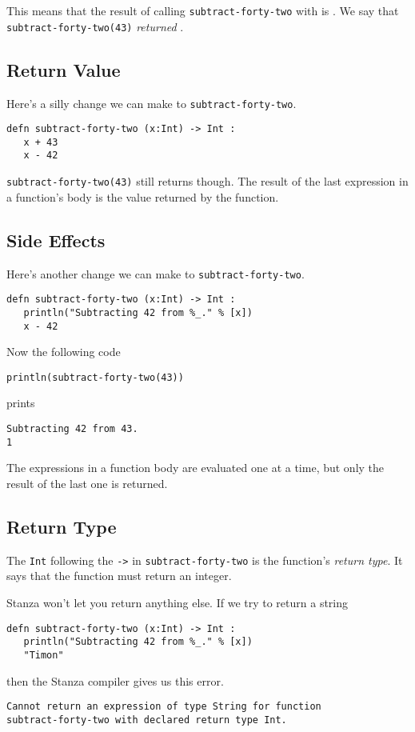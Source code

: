 \documentclass[10pt,oneside]{book}
\begin{document}
This means that the result of calling \texttt{\frenchspacing subtract-forty-two} with \texttt{} is \texttt{}. We say that \texttt{\frenchspacing subtract-forty-two(43)} {\em returned} \texttt{}. 

\subsection*{Return Value}
Here's a silly change we can make to \texttt{\frenchspacing subtract-forty-two}. 
\begin{lstlisting}
defn subtract-forty-two (x:Int) -> Int :
   x + 43
   x - 42   
\end{lstlisting}
\texttt{\frenchspacing subtract-forty-two(43)} still returns \texttt{} though. The result of the last expression in a function's body is the value returned by the function. 

\subsection*{Side Effects}
Here's another change we can make to \texttt{\frenchspacing subtract-forty-two}.
\begin{lstlisting}
defn subtract-forty-two (x:Int) -> Int :
   println("Subtracting 42 from %_." % [x])
   x - 42   
\end{lstlisting}

Now the following code
\begin{lstlisting}
println(subtract-forty-two(43))
\end{lstlisting}
prints
\begin{lstlisting}
Subtracting 42 from 43.
1
\end{lstlisting}

The expressions in a function body are evaluated one at a time, but only the result of the last one is returned.

\subsection*{Return Type}
The \texttt{\frenchspacing Int} following the \texttt{\frenchspacing ->} in \texttt{\frenchspacing subtract-forty-two} is the function's {\em return type}. It says that the function must return an integer. 

Stanza won't let you return anything else. If we try to return a string
\begin{lstlisting}
defn subtract-forty-two (x:Int) -> Int :
   println("Subtracting 42 from %_." % [x])
   "Timon"
\end{lstlisting}
then the Stanza compiler gives us this error.
\begin{lstlisting}
Cannot return an expression of type String for function 
subtract-forty-two with declared return type Int.
\end{lstlisting}
\end{document}
